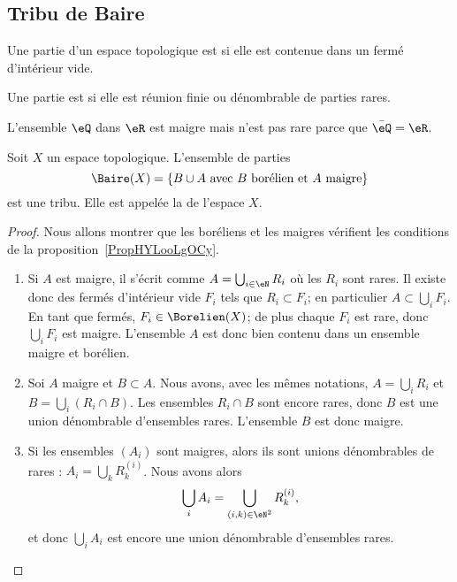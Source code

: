 \subsection{Tribu de Baire}

\begin{definition}
    Une partie d'un espace topologique est  si elle est contenue dans un fermé d'intérieur vide.

    Une partie est  si elle est réunion finie ou dénombrable de parties rares.
\end{definition}

\begin{example}
    L'ensemble \( \eQ\) dans \( \eR\) est maigre mais n'est pas rare parce que \( \bar\eQ=\eR\).
\end{example}

\begin{proposition}
    Soit \( X\) un espace topologique. L'ensemble de parties
    \begin{equation}
        \Baire(X)=\{ B\cup A\text{ avec } B\text{ borélien et } A\text{ maigre} \}
    \end{equation}
    est une tribu. Elle est appelée la  de l'espace \( X\).
\end{proposition}

\begin{proof}
    Nous allons montrer que les boréliens et les maigres vérifient les conditions de la proposition~\ref{PropHYLooLgOCy}.
    \begin{enumerate}
        \item
            Si \( A\) est maigre, il s'écrit comme \( A=\bigcup_{i\in \eN}R_i\) où les \( R_i\) sont rares. Il existe donc des fermés d'intérieur vide \( F_i\) tels que \( R_i\subset F_i\); en particulier \( A\subset\bigcup_i F_i\). En tant que fermés, \( F_i\in\Borelien(X)\); de plus chaque \( F_i\) est rare, donc \( \bigcup_iF_i\) est maigre. L'ensemble \( A\) est donc bien contenu dans un ensemble maigre et borélien.
        \item
            Soi \( A\) maigre et \( B\subset A\). Nous avons, avec les mêmes notations, \( A=\bigcup_iR_i\) et \( B=\bigcup_i(R_i\cap B)\). Les ensembles \( R_i\cap B\) sont encore rares, donc \( B\) est une union dénombrable d'ensembles rares. L'ensemble \( B\) est donc maigre.
        \item
            Si les ensembles \( (A_i)\) sont maigres, alors ils sont unions dénombrables de rares : \( A_i=\bigcup_kR_k^{(i)}\). Nous avons alors
            \begin{equation}
                \bigcup_iA_i=\bigcup_{(i,k)\in \eN^2}R_k^{(i)},
            \end{equation}
            et donc \( \bigcup_iA_i\) est encore une union dénombrable d'ensembles rares.
    \end{enumerate}
\end{proof}

